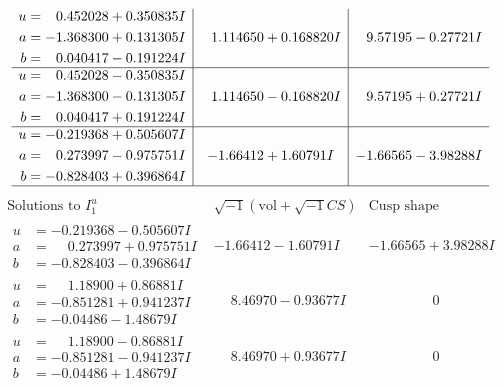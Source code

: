 \documentclass[1p]{elsarticle_modified}
\theoremstyle{definition}
\newcommand{\I}{\sqrt{-1}}
\begin{document}
$$\begin{array}{c|c|c}
\begin{aligned}
u &= \phantom{-}0.452028 + 0.350835 I \\
a &= -1.368300 + 0.131305 I \\
b &= \phantom{-}0.040417 - 0.191224 I\end{aligned}
 & \phantom{-}1.114650 + 0.168820 I & \phantom{-}9.57195 - 0.27721 I \\ \hline\begin{aligned}
u &= \phantom{-}0.452028 - 0.350835 I \\
a &= -1.368300 - 0.131305 I \\
b &= \phantom{-}0.040417 + 0.191224 I\end{aligned}
 & \phantom{-}1.114650 - 0.168820 I & \phantom{-}9.57195 + 0.27721 I \\ \hline\begin{aligned}
u &= -0.219368 + 0.505607 I \\
a &= \phantom{-}0.273997 - 0.975751 I \\
b &= -0.828403 + 0.396864 I\end{aligned}
 & -1.66412 + 1.60791 I & -1.66565 - 3.98288 I\\
 \hline 
 \end{array}$$\newpage$$\begin{array}{c|c|c}  
\text{Solutions to }I^u_{1}& \I (\text{vol} + \sqrt{-1}CS) & \text{Cusp shape}\\
 \hline 
\begin{aligned}
u &= -0.219368 - 0.505607 I \\
a &= \phantom{-}0.273997 + 0.975751 I \\
b &= -0.828403 - 0.396864 I\end{aligned}
 & -1.66412 - 1.60791 I & -1.66565 + 3.98288 I \\ \hline\begin{aligned}
u &= \phantom{-}1.18900 + 0.86881 I \\
a &= -0.851281 + 0.941237 I \\
b &= -0.04486 - 1.48679 I\end{aligned}
 & \phantom{-}8.46970 - 0.93677 I & \phantom{-0.000000 } 0 \\ \hline\begin{aligned}
u &= \phantom{-}1.18900 - 0.86881 I \\
a &= -0.851281 - 0.941237 I \\
b &= -0.04486 + 1.48679 I\end{aligned}
 & \phantom{-}8.46970 + 0.93677 I & \phantom{-0.000000 } 0 \\ \hline\begin{aligned}

\end{aligned}
\end{array}$$
\end{document}
